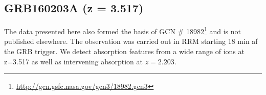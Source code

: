 \documentclass[iop, twocolappendix, numberedappendix, tighten, appendixfloats]{emulateapj}
\begin{document}
	\subsection{GRB160203A (z = 3.517)}
	The data presented here also formed the basis of GCN \#
	18982\footnote{\url{http://gcn.gsfc.nasa.gov/gcn3/18982.gcn3}} and is not published
	elsewhere.
	The observation was carried out in RRM starting 18 min af the GRB trigger.
	We detect absorption features from a wide range of ions at z=3.517 
	as well as intervening absorption at $z=2.203$.
	
\end{document}
